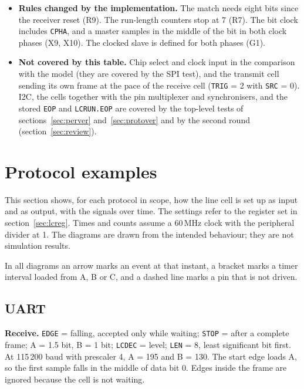 \documentclass[10pt,a4paper]{article}
\newcommand{\reg}[1]{\texttt{#1}}
\begin{document}
\begin{itemize}
\item \textbf{Rules changed by the implementation.} The match needs eight bits since the receiver reset (R9). The
run-length counters stop at 7 (R7). The bit clock includes \reg{CPHA}, and a master samples in the middle
of the bit in both clock phases (X9, X10). The clocked slave is defined for both phases (G1).
\item \textbf{Not covered by this table.} Chip select and clock input in the comparison with the model (they are
covered by the SPI test), and the transmit cell sending its own frame at the pace of the receive cell
(\reg{TRIG} = 2 with \reg{SRC} = 0). I2C, the cells together with the pin multiplexer and synchronisers, and the
stored \reg{EOP} and \reg{LCRUN.EOP} are covered by the top-level tests of
sections~\ref{sec:perver} and~\ref{sec:protover} and by the second round (section~\ref{sec:review}).
\end{itemize}

\section{Protocol examples}\label{sec:ex}

This section shows, for each protocol in scope, how the line cell is set up as input and as output, with the
signals over time. The settings refer to the register set in section~\ref{sec:lcreg}. Times and counts assume a
60\,MHz clock with the peripheral divider at 1. The diagrams are drawn from the intended behaviour; they are not simulation results.

In all diagrams an arrow marks an event at that instant, a bracket marks a timer interval loaded from A, B or C,
and a dashed line marks a pin that is not driven.


\subsection{UART}

\textbf{Receive.} \reg{EDGE} = falling, accepted only while waiting; \reg{STOP} = after a complete frame;
A = 1.5 bit, B = 1 bit; \reg{LCDEC} = level; \reg{LEN} = 8, least significant bit first. At 115\,200 baud with
prescaler 4, A = 195 and B = 130. The start edge loads A, so the first sample falls in the middle of data bit 0.
Edges inside the frame are ignored because the cell is not waiting.
\end{document}
